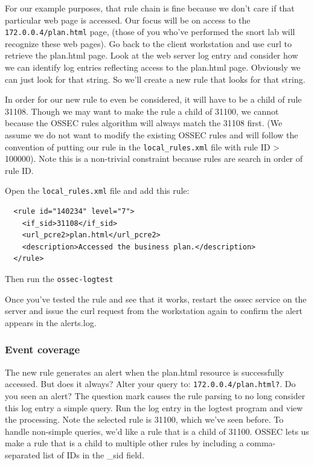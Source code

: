 For our example purposes, that rule chain is fine because we don't care if that particular web page is accessed.  Our focus will
be on access to the {\tt 172.0.0.4/plan.html} page, (those of you who've performed the snort lab will recognize
these web pages).   Go back to the client workstation and use curl to retrieve the plan.html page.  Look at the 
web server log entry and consider how we can identify log entries reflecting access to the plan.html page.  
Obviously we can just look for that string.  So we'll create a new rule that looks for that string.

In order for our new rule to even be considered, it will have to be a child of rule 31108.  Though we may want to 
make the rule a child of 31100, we cannot because the OSSEC rules algorithm will always match the 31108 first. 
(We assume we do not want
to modify the existing OSSEC rules and will follow the convention of putting our rule in the {\tt local\_rules.xml} file
with rule ID > 100000).  Note this is a non-trivial constraint because rules are search in order of rule ID.

Open the {\tt local\_rules.xml} file and add this rule:
\begin{verbatim}
  <rule id="140234" level="7">
    <if_sid>31108</if_sid>
    <url_pcre2>plan.html</url_pcre2>
    <description>Accessed the business plan.</description>
  </rule>

\end{verbatim}
Then run the {\tt ossec-logtest}

Once you've tested the rule and see that it works, restart the ossec service on the server and issue the curl request from 
the workstation again to confirm the alert appears in the alerts.log.

\subsubsection{Event coverage}
The new rule generates an alert when the plan.html resource is successfully accessed.  But does it always?
Alter your query to: {\tt 172.0.0.4/plan.html?}.  Do you seen an alert?  The question mark causes the rule parsing
to no long consider this log entry a simple query.  Run the log entry in the logtest program and view the processing.
Note the selected rule is 31100, which we've seen before.  To handle non-simple queries, we'd like a rule that is a
child of 31100.  OSSEC lets us make a rule that is a child to multiple other rules by including a comma-separated list
of IDs in the {\if\_sid} field. 

